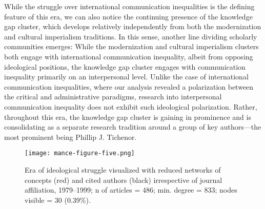 \documentclass{tufte-handout}
\begin{document}
While the struggle over international communication inequalities is the
defining feature of this era, we can also notice the continuing presence
of the knowledge gap cluster, which develops relatively independently
from both the modernization and cultural imperialism traditions. In this
sense, another line dividing scholarly communities emerges: While the
modernization and cultural imperialism clusters both engage with
international communication inequality, albeit from opposing ideological
positions, the knowledge gap cluster engages with communication
inequality primarily on an interpersonal level. Unlike the case of
international communication inequalities, where our analysis revealed a
polarization between the critical and administrative paradigms, research
into interpersonal communication inequality does not exhibit such
ideological polarization. Rather, throughout this era, the knowledge gap
cluster is gaining in prominence and is consolidating as a separate
research tradition around a group of key authors---the most prominent
being Phillip J. Tichenor.

\begin{figure}
    \centering
    \texttt{[image: mance-figure-five.png]}
    \caption{Era of ideological struggle visualized with reduced networks
of concepts (red) and cited authors (black) irrespective of journal
affiliation, 1979--1999; n of articles = 486; min. degree = 833; nodes
visible = 30 (0.39\%).}
    \label{fig:five}
\end{figure}
\end{document}

